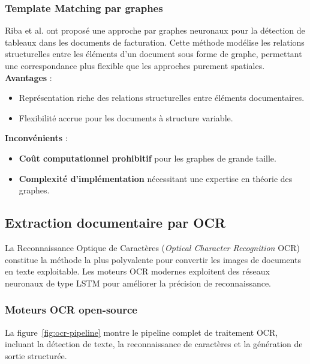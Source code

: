 \subsubsection{Template Matching par graphes}

Riba et al. \cite{riba2022table} ont proposé une approche par graphes neuronaux pour la détection de tableaux dans les documents de facturation. Cette méthode modélise les relations structurelles entre les éléments d'un document sous forme de graphe, permettant une correspondance plus flexible que les approches purement spatiales.
\\
\textbf{Avantages} :
\begin{itemize}[label=, font=\large \color{darkgray}]
\item Représentation riche des relations structurelles entre éléments documentaires.
\item Flexibilité accrue pour les documents à structure variable.
\end{itemize}

\textbf{Inconvénients} :
\begin{itemize}[label=, font=\large \color{darkgray}]
\item \textbf{Coût computationnel prohibitif} pour les graphes de grande taille.
\item \textbf{Complexité d'implémentation} nécessitant une expertise en théorie des graphes.
\end{itemize}


\subsection{Extraction documentaire par OCR}

La Reconnaissance Optique de Caractères (\textit{Optical Character Recognition} OCR) constitue la méthode la plus polyvalente pour convertir les images de documents en texte exploitable. Les moteurs OCR modernes exploitent des réseaux neuronaux de type LSTM pour améliorer la précision de reconnaissance.

\subsubsection{Moteurs OCR open-source}

La figure~\ref{fig:ocr-pipeline} montre le pipeline complet de traitement OCR, incluant la détection de texte, la reconnaissance de caractères et la génération de sortie structurée.


